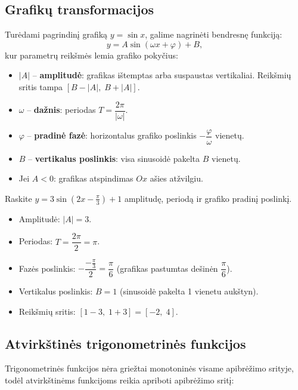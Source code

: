 \subsection{Grafikų transformacijos}

Turėdami pagrindinį grafiką \(y = \sin x\), galime nagrinėti bendresnę funkciją:
\[
y = A \sin(\omega x + \varphi) + B,
\]
kur parametrų reikšmės lemia grafiko pokyčius:

\begin{itemize}
    \item \(|A|\) – \textbf{amplitudė}: grafikas ištemptas arba suspaustas vertikaliai. Reikšmių sritis tampa \([B - |A|,\; B + |A|]\).
    \item \(\omega\) – \textbf{dažnis}: periodas \(T = \dfrac{2\pi}{|\omega|}\).
    \item \(\varphi\) – \textbf{pradinė fazė}: horizontalus grafiko poslinkis \(-\dfrac{\varphi}{\omega}\) vienetų.
    \item \(B\) – \textbf{vertikalus poslinkis}: visa sinusoidė pakelta \(B\) vienetų.
    \item Jei \(A < 0\): grafikas atspindimas \(Ox\) ašies atžvilgiu.
\end{itemize}

\begin{example}
Raskite \(y = 3\sin(2x - \frac{\pi}{3}) + 1\) amplitudę, periodą ir grafiko pradinį poslinkį.
\begin{itemize}
    \item Amplitudė: \(|A| = 3\).
    \item Periodas: \(T = \dfrac{2\pi}{2} = \pi\).
    \item Fazės poslinkis: \(-\dfrac{-\frac{\pi}{3}}{2} = \dfrac{\pi}{6}\) (grafikas pastumtas dešinėn \(\dfrac{\pi}{6}\)).
    \item Vertikalus poslinkis: \(B = 1\) (sinusoidė pakelta 1 vienetu aukštyn).
    \item Reikšmių sritis: \([1-3,\; 1+3] = [-2,\; 4]\).
\end{itemize}
\end{example}

\subsection{Atvirkštinės trigonometrinės funkcijos}

Trigonometrinės funkcijos nėra griežtai monotoninės visame apibrėžimo srityje, todėl atvirkštinėms funkcijoms reikia apriboti apibrėžimo sritį:

